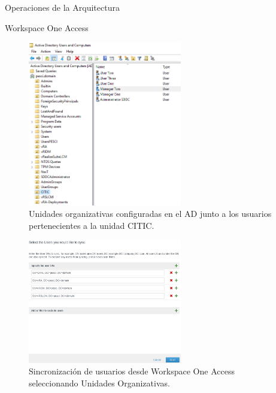 \begin{subsection}{Operaciones de la Arquitectura}
\begin{subsubsection}{Workspace One Access}
        \begin{figure}[h]
            \centering
            \includegraphics[width=0.6\textwidth]{imaxes/pruebaconcepto/vrealize/UnidadesOrg-Users-AD.png}
            \caption{Unidades organizativas configuradas en el AD junto a los usuarios pertenecientes a la unidad CITIC.}
            \label{fig:users-defined-AD}
        \end{figure}
        \FloatBarrier
        \begin{figure}[h]
            \centering
            \includegraphics[width=0.6\textwidth]{imaxes/pruebaconcepto/vrealize/syncing-users.png}
            \caption{Sincronización de usuarios desde Workspace One Access seleccionando Unidades Organizativas.}
            \label{fig:users-defined-WSA}
        \end{figure}
        \FloatBarrier
        \begin{figure}[h]

\end{figure}
\end{subsubsection}
\end{subsection}
